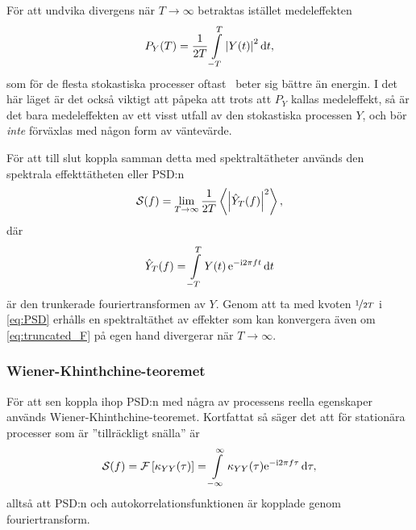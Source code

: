 För att undvika divergens när $T\to\infty$ betraktas istället medeleffekten 
\begin{equation}\label{eq:power}
P_Y(T) = \frac{1}{2T} \int_{-T}^{T} \abs{Y(t)}^2\id{t},
\end{equation}
som för de flesta stokastiska processer oftast~\cite{Miller_probability2012} beter sig bättre än energin.
I det här läget är det också viktigt att påpeka att trots att $P_Y$ kallas medeleffekt, så är det bara medeleffekten av ett visst utfall av den stokastiska processen $Y$, och bör \emph{inte} förväxlas med någon form av väntevärde. 

För att till slut koppla samman detta med spektraltätheter används den spektrala effekttätheten eller PSD:n
\begin{equation}\label{eq:PSD}
\mathcal{S}(f) =  \lim_{T\to\infty}\dfrac{1}{2T} \ev{\abs{\hat{Y}_T(f)}^2},
\end{equation} 
där
\begin{equation}\label{eq:truncated_F}
\hat{Y}_T(f) = \int_{-T}^{T} Y(t)\,\ee^{-\ii 2\pi f t} \id{t}
\end{equation}
är den trunkerade fouriertransformen av $Y$. Genom att ta med kvoten $\nicefrac{1}{2T}$ i \eqref{eq:PSD} erhålls en spektraltäthet av effekter som kan konvergera även om \eqref{eq:truncated_F} på egen hand divergerar när $T\to\infty$. 

\subsubsection{Wiener-Khinthchine-teoremet}
För att sen koppla ihop PSD:n med några av processens reella egenskaper används Wiener-Khinthchine-teoremet. Kortfattat så säger det att för stationära processer som är ''tillräckligt snälla'' är \cite{Miller_probability2012}
\begin{equation}\label{eq:W-K-theorem}
\mathcal{S}(f) = \mathcal{F}\left[\kappa_{YY}(\tau)\right] 
= \int_{-\infty}^{\infty} 
\kappa_{YY}(\tau) \ee^{-\ii 2\pi f\tau} \id\tau,
\end{equation}
alltså att PSD:n och autokorrelationsfunktionen är kopplade genom fouriertransform. 

